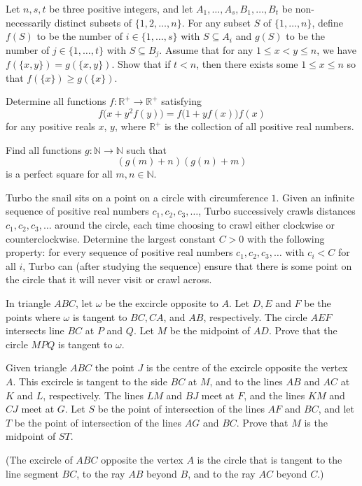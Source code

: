\documentclass[11pt]{scrartcl}
\begin{document}
\begin{problem}[183608717611474]
Let $n,s,t$ be three positive integers, and let $A_1,\ldots, A_s, B_1,\ldots, B_t$ be non-necessarily distinct subsets of $\{1,2,\ldots,n\}$. For any subset $S$ of $\{1,\ldots,n\}$, define $f(S)$ to be the number of $i\in\{1,\ldots,s\}$ with $S\subseteq A_i$ and $g(S)$ to be the number of $j\in\{1,\ldots,t\}$ with $S\subseteq B_j$. Assume that for any $1\leq x<y\leq n$, we have $f(\{x,y\})=g(\{x,y\})$. Show that if $t<n$, then there exists some $1\leq x\leq n$ so that $f(\{x\})\geq g(\{x\})$.
\end{problem}
\begin{problem}[187361876994205]
	Determine all functions $f: \mathbb{R}^+ \to \mathbb{R}^+$ satisfying
\[f\bigl(x + y^2 f(y)\bigr) = f\bigl(1 + yf(x)\bigr)f(x)\]for any positive reals $x$, $y$, where $\mathbb{R}^+$ is the collection of all positive real numbers.
\end{problem}
\begin{problem}[192311188438770]
Find all functions $g:\mathbb{N}\rightarrow\mathbb{N}$ such that\[\left(g(m)+n\right)\left(g(n)+m\right)\]is a perfect square for all $m,n\in\mathbb{N}.$
\end{problem}
\begin{problem}[194924255136905]
Turbo the snail sits on a point on a circle with circumference $1$. Given an infinite sequence of positive real numbers $c_1, c_2, c_3, \dots$, Turbo successively crawls distances $c_1, c_2, c_3, \dots$ around the circle, each time choosing to crawl either clockwise or counterclockwise.
Determine the largest constant $C > 0$ with the following property: for every sequence of positive real numbers $c_1, c_2, c_3, \dots$ with $c_i < C$ for all $i$, Turbo can (after studying the sequence) ensure that there is some point on the circle that it will never visit or crawl across.
\end{problem}
\begin{problem}[199006625390154]
In triangle $ABC$, let $\omega$ be the excircle opposite to $A$. Let $D, E$ and $F$ be the points where $\omega$ is tangent to $BC, CA$, and $AB$, respectively. The circle $AEF$ intersects line $BC$ at $P$ and $Q$. Let $M$ be the midpoint of $AD$. Prove that the circle $MPQ$ is tangent to $\omega$.
\end{problem}
\begin{problem}[201785415121070]
	Given triangle $ABC$ the point $J$ is the centre of the excircle opposite the vertex $A.$ This excircle is tangent to the side $BC$ at $M$, and to the lines $AB$ and $AC$ at $K$ and $L$, respectively. The lines $LM$ and $BJ$ meet at $F$, and the lines $KM$ and $CJ$ meet at $G.$ Let $S$ be the point of intersection of the lines $AF$ and $BC$, and let $T$ be the point of intersection of the lines $AG$ and $BC.$ Prove that $M$ is the midpoint of $ST.$

(The excircle of $ABC$ opposite the vertex $A$ is the circle that is tangent to the line segment $BC$, to the ray $AB$ beyond $B$, and to the ray $AC$ beyond $C$.)
\end{problem}
\end{document}

